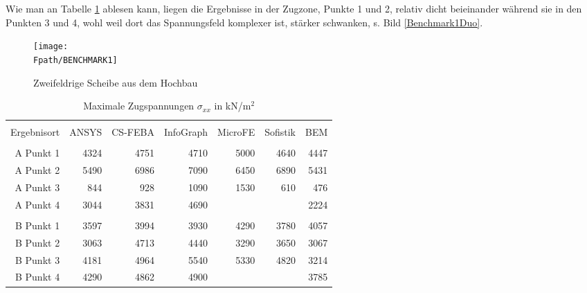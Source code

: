 {Wie man an Tabelle \ref{TabBenchmark1} ablesen kann, liegen die Ergebnisse in der
Zugzone, Punkte 1 und 2, relativ dicht beieinander w\"{a}hrend sie in den Punkten 3 und 4,
wohl weil dort das Spannungsfeld komplexer ist, st\"{a}rker schwanken, s. Bild
\ref{Benchmark1Duo}.
\begin{figure}[tbp]
\if {} \sidecaption \fi
\texttt{[image: \\Fpath/BENCHMARK1]}
\caption{Zweifeldrige Scheibe aus dem Hochbau} \label{Benchmark1}
\end{figure}%
\begin{table}
\caption{ Maximale Zugspannungen $\sigma_{xx}$ in kN/m$^2$} \label{TabBenchmark1}
\begin{tabular}{rrrrrrr}
\noalign{\hrule\smallskip} \\[1mm]
Ergebnisort &      ANSYS &    CS-FEBA &  InfoGraph &    MicroFE &   Sofistik &        BEM \\
\noalign{\hrule\smallskip} \\[1mm]
 A Punkt 1 &       4324 &       4751 &       4710 &       5000 &       4640 &       4447 \\
 A Punkt 2 &       5490 &       6986 &       7090 &       6450 &       6890 &       5431 \\
 A Punkt 3 &        844 &        928 &       1090 &       1530 &        610 &        476 \\
 A Punkt 4 &       3044 &       3831 &       4690 &            &            &       2224 \\
           &            &            &            &            &            &            \\
 B Punkt 1 &       3597 &       3994 &       3930 &       4290 &       3780 &       4057 \\
 B Punkt 2 &       3063 &       4713 &       4440 &       3290 &       3650 &       3067 \\
 B Punkt 3 &       4181 &       4964 &       5540 &       5330 &       4820 &       3214 \\
 B Punkt 4 &       4290 &       4862 &       4900 &            &            &       3785 \\
\end{tabular}
\end{table}



}
